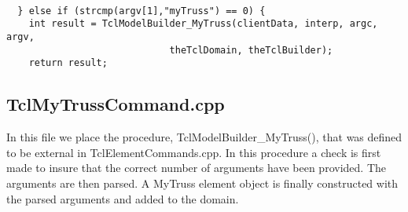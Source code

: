 \documentclass[12pt]{article}
\begin{document}
{\sf \begin{verbatim}

  } else if (strcmp(argv[1],"myTruss") == 0) {
    int result = TclModelBuilder_MyTruss(clientData, interp, argc, argv,
			                 theTclDomain, theTclBuilder);
    return result;

\end{verbatim} } 


\subsection {\sf TclMyTrussCommand.cpp}
In this file we place the procedure, TclModelBuilder\_MyTruss(), that
was defined to be external in TclElementCommands.cpp. In this
procedure a check is first made to insure that the correct number of
arguments have been provided. The arguments are then parsed. A MyTruss
element object is finally constructed with the parsed arguments and
added to the domain. 
\end{document}
